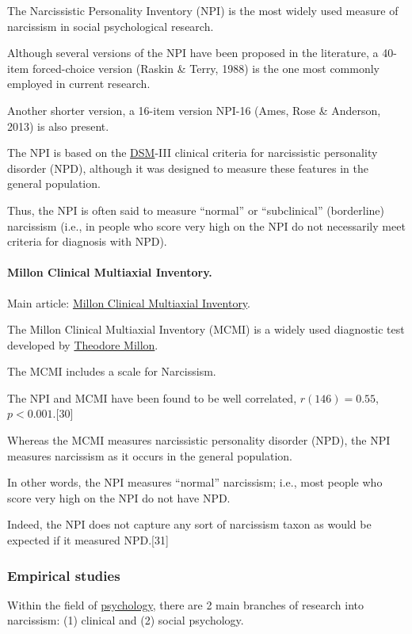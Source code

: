 \documentclass[oneside]{book}
\numberwithin{equation}{section}
\begin{document}
The Narcissistic Personality Inventory (NPI) is the most widely used measure of narcissism in social psychological research.

Although several versions of the NPI have been proposed in the literature, a 40-item forced-choice version (Raskin \& Terry, 1988) is the one most commonly employed in current research.

Another shorter version, a 16-item version NPI-16 (Ames, Rose \& Anderson, 2013) is also present.

The NPI is based on the \href{https://en.wikipedia.org/wiki/Diagnostic_and_Statistical_Manual_of_Mental_Disorders}{DSM}-III clinical criteria for narcissistic personality disorder (NPD), although it was designed to measure these features in the general population.

Thus, the NPI is often said to measure ``normal'' or ``subclinical'' (borderline) narcissism (i.e., in people who score very high on the NPI do not necessarily meet criteria for diagnosis with NPD).

\paragraph{Millon Clinical Multiaxial Inventory.} Main article: \href{https://en.wikipedia.org/wiki/Millon_Clinical_Multiaxial_Inventory}{Millon Clinical Multiaxial Inventory}.

The Millon Clinical Multiaxial Inventory (MCMI) is a widely used diagnostic test developed by \href{https://en.wikipedia.org/wiki/Theodore_Millon}{Theodore Millon}.

The MCMI includes a scale for Narcissism.

The NPI and MCMI have been found to be well correlated, $r(146) = 0.55$, $p < 0.001$.[30]

Whereas the MCMI measures narcissistic personality disorder (NPD), the NPI measures narcissism as it occurs in the general population.

In other words, the NPI measures ``normal'' narcissism; i.e., most people who score very high on the NPI do not have NPD.

Indeed, the NPI does not capture any sort of narcissism taxon as would be expected if it measured NPD.[31]

\subsubsection{Empirical studies}
Within the field of \href{https://en.wikipedia.org/wiki/Psychology}{psychology}, there are 2 main branches of research into narcissism: (1) clinical and (2) social psychology.
\end{document}
